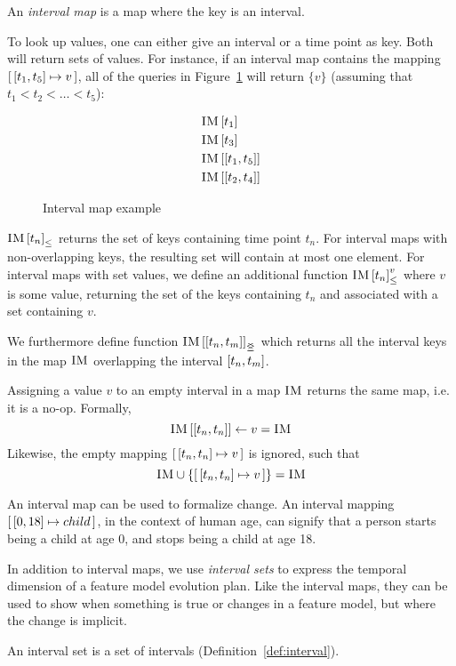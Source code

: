 \begin{definition}
An \emph{interval map} is a map where the key is an interval. 
  \label{def:interval-map}
\end{definition}

To look up values, one can either give an interval or a time point as key. Both will return sets of values. For instance, if an interval map  contains the mapping $\intervalmapping{t_1}{t_5}{v}$, all of the queries in Figure~\ref{ex:interval-map} will return $\{v\}$ (assuming that $t_1 < t_2 < \ldots < t_5$):

\begin{figure}[h]
  \begin{align*}
    & \lookup{\map{IM}}{t_1} \\
    & \lookup{\map{IM}}{t_3} \\
    & \lookup{\map{IM}}{\interval{t_1}{t_5}} \\
    & \lookup{\map{IM}}{\interval{t_2}{t_4}}
  \end{align*}
  \caption{Interval map example}
  \label{ex:interval-map}
\end{figure}

${\textsc{IM} \left[ t_n \right]}_{\leq}$ returns the set of keys containing time point $t_n$. For interval maps with non-overlapping keys, the resulting set will contain at most one element. For interval maps with set values, we define an additional function ${\textsc{IM} \left[ t_n \right]^{v}_{\leq}}$ where $v$ is some value, returning the set of the keys containing $t_n$ and associated with a set containing $v$. 

We furthermore define function $\overlapping{\map{IM}}{t_n}{t_m}$ which returns all the interval keys in the map $\textsc{IM}$ overlapping the interval $\interval{t_n}{t_m}$. 

Assigning a value $v$ to an empty interval in a map $\textsc{IM}$ returns the same map, i.e. it is a no-op. Formally,
\[
  \lookup{\map{IM}}{\interval{t_n}{t_n}} \assign v = \map{IM}
\]
Likewise, the empty mapping $\intervalmapping{t_n}{t_n}{v}$ is ignored, such that
\[
  \map{IM} \cup \set{\intervalmapping{t_n}{t_n}{v}} = \map{IM}
\]

An interval map can be used to formalize change. An interval mapping $\intervalmapping{0}{18}{child}$, in the context of human age, can signify that a person starts being a child at age 0, and stops being a child at age 18.

In addition to interval maps, we use \emph{interval sets} to express the temporal dimension of a feature model evolution plan. Like the interval maps, they can be used to show when something is true or changes in a feature model, but where the change is implicit. 
\\
\begin{definition}
  An interval set is a set of intervals (Definition~\vref{def:interval}). 
\end{definition}


